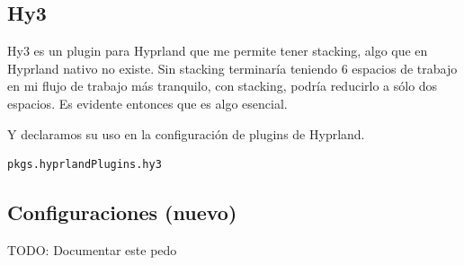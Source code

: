 \documentclass[11pt]{article}
\begin{document}
\subsection{Hy3}
\label{sec:orgf14ddd9}

Hy3 es un plugin para Hyprland que me permite tener stacking, algo que en Hyprland nativo no existe. Sin stacking terminaría teniendo 6 espacios de trabajo en mi flujo de trabajo más tranquilo, con stacking, podría reducirlo a sólo dos espacios. Es evidente entonces que es algo esencial.

Y declaramos su uso en la configuración de plugins de Hyprland.

\begin{verbatim}
pkgs.hyprlandPlugins.hy3
\end{verbatim}
\subsection{Configuraciones (nuevo)}
\label{sec:org79d35f0}

TODO: Documentar este pedo
\end{document}
